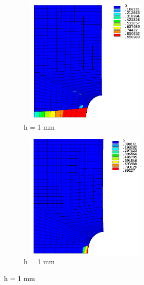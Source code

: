 \documentclass[12pt,a4paper,twoside,openright]{report}
\begin{document}
\begin{figure}[htbp!]
     \begin{subfigure}{0.4\textwidth}
         \includegraphics[width=6.6cm,height=6.2cm]{25.d1-1-r.png}
         \caption{h = 1 mm}
         \label{fig:d1-1-r}
     \end{subfigure}
    \hspace{1.8cm}
     \captionsetup[subfigure]{justification=centering}
     \begin{subfigure}{0.4\textwidth}
          \includegraphics[width=6.6cm,height=6.2cm]{25.d1-1-nr.png}
         \caption{h = 1 mm}
         \label{fig:d1-1-nr}
     \end{subfigure}
\end{figure}
\FloatBarrier
\end{document}
